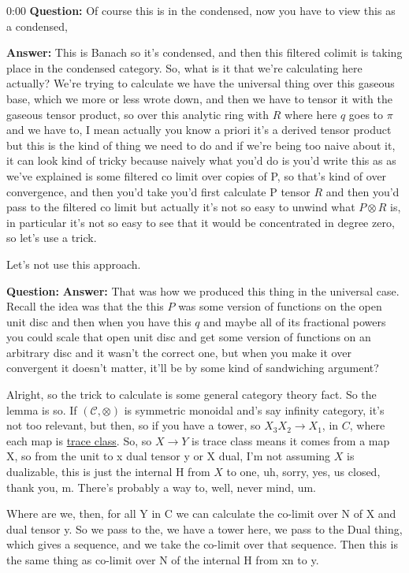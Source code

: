 \begin{unfinished}{0:00}
\textbf{Question:} Of course this is in the condensed, now you have to view this as a condensed, 

\textbf{Answer:} This is Banach so it's condensed, and then this filtered colimit is taking place in the condensed category. So, what is it that we're calculating here actually? We're trying to calculate we have the universal thing over this gaseous base, which we more or less wrote down, and then we have to tensor it with the gaseous tensor product, so over this analytic ring with $R$ where here $q$ goes to $\pi$ and we have to, I mean actually you know a priori it's a derived tensor product but this is the kind of thing we need to do and if we're being too naive about it, it can look kind of tricky because naively what you'd do is you'd write this as as we've explained is some filtered co limit over copies of P, so that's kind of over convergence, and then you'd take you'd first calculate P tensor $R$ and then you'd pass to the filtered co limit but actually it's not so easy to unwind what $P \otimes R$ is, in particular it's not so easy to see that it would be concentrated in degree zero, so let's use a trick.

Let's not use this approach. 

\textbf{Question:} 
\textbf{Answer:} That was how we produced this thing in the universal case. Recall the idea was that the this $P$ was some version of functions on the open unit disc and then when you have this $q$ and maybe all of its fractional powers you could scale that open unit disc and get some version of functions on an arbitrary disc and it wasn't the correct one, but when you make it over convergent it doesn't matter, it'll be by some kind of sandwiching argument? 

Alright, so the trick to calculate is some general category theory fact.
So the lemma is so. If $(\mathcal{C}, \otimes)$ is symmetric monoidal and's say infinity category, it's not too relevant, but then, so if you have a tower, so $X_3 X_2 \to X_1$, in $C$, where each map is \underline{trace class}. So, so $X \to Y$ is trace class means it comes from a map X, so from the unit to x dual tensor y or X dual, I'm not assuming $X$ is dualizable, this is just the internal H from $X$ to one, uh, sorry, yes, us closed, thank you, m. There's probably a way to, well, never mind, um.

Where are we, then, for all Y in C we can calculate the co-limit over N of X and dual tensor y. So we pass to the, we have a tower here, we pass to the Dual thing, which gives a sequence, and we take the co-limit over that sequence. Then this is the same thing as co-limit over N of the internal H from xn to y.


\end{unfinished}
